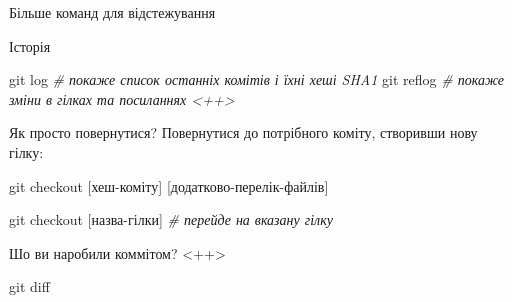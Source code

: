 \documentclass[
  ignorenonframetext,
  aspectratio=169,
]{beamer}
\newenvironment{Shaded}{}{}
\newcommand{\CommentTok}[1]{\textcolor[rgb]{0.38,0.63,0.69}{\textit{#1}}}
\newcommand{\FunctionTok}[1]{\textcolor[rgb]{0.02,0.16,0.49}{#1}}
\newcommand{\NormalTok}[1]{#1}
\newcommand{\PreprocessorTok}[1]{\textcolor[rgb]{0.74,0.48,0.00}{#1}}
\newcommand{\SpecialStringTok}[1]{\textcolor[rgb]{0.73,0.40,0.53}{#1}}
\begin{document}
\begin{frame}[fragile]{Більше команд для відстежування}
\protect\hypertarget{ux431ux456ux43bux44cux448ux435-ux43aux43eux43cux430ux43dux434-ux434ux43bux44f-ux432ux456ux434ux441ux442ux435ux436ux443ux432ux430ux43dux43dux44f}{}
\begin{block}{Історія}
\protect\hypertarget{ux456ux441ux442ux43eux440ux456ux44f}{}
\begin{Shaded}
\begin{Highlighting}[]
\FunctionTok{git}\NormalTok{ log     }\CommentTok{\# покаже список останніх комітів і їхні хеші SHA1}
\FunctionTok{git}\NormalTok{ reflog  }\CommentTok{\# покаже зміни в гілках та посиланнях \textless{}++\textgreater{}}
\end{Highlighting}
\end{Shaded}

\pause
\end{block}

\begin{block}{Як просто повернутися?}
\protect\hypertarget{ux44fux43a-ux43fux440ux43eux441ux442ux43e-ux43fux43eux432ux435ux440ux43dux443ux442ux438ux441ux44f}{}
Повернутися до потрібного коміту, створивши нову гілку:

\begin{Shaded}
\begin{Highlighting}[]
\FunctionTok{git}\NormalTok{ checkout }\PreprocessorTok{[}\SpecialStringTok{хеш}\PreprocessorTok{{-}}\SpecialStringTok{коміту}\PreprocessorTok{]} \PreprocessorTok{[}\SpecialStringTok{додатково}\PreprocessorTok{{-}}\SpecialStringTok{перелік}\PreprocessorTok{{-}}\SpecialStringTok{файлів}\PreprocessorTok{]}
\end{Highlighting}
\end{Shaded}

\begin{Shaded}
\begin{Highlighting}[]
\FunctionTok{git}\NormalTok{ checkout }\PreprocessorTok{[}\SpecialStringTok{назва}\PreprocessorTok{{-}}\SpecialStringTok{гілки}\PreprocessorTok{]} \CommentTok{\# перейде на вказану гілку}
\end{Highlighting}
\end{Shaded}

\pause
\end{block}

\begin{block}{Шо ви наробили коммітом? \textless++\textgreater{}}
\protect\hypertarget{ux448ux43e-ux432ux438-ux43dux430ux440ux43eux431ux438ux43bux438-ux43aux43eux43cux43cux456ux442ux43eux43c}{}
\begin{Shaded}
\begin{Highlighting}[]
\FunctionTok{git}\NormalTok{ diff}
\end{Highlighting}
\end{Shaded}
\end{block}
\end{frame}
\end{document}
